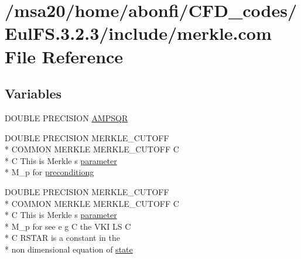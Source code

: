 \hypertarget{msa20_2home_2abonfi_2_c_f_d__codes_2_eul_f_s_83_82_83_2include_2merkle_8com}{\section{/msa20/home/abonfi/\-C\-F\-D\-\_\-codes/\-Eul\-F\-S.3.2.3/include/merkle.com File Reference}
\label{msa20_2home_2abonfi_2_c_f_d__codes_2_eul_f_s_83_82_83_2include_2merkle_8com}
}
\subsection*{Variables}
\begin{DoxyCompactItemize}
\item 
D\-O\-U\-B\-L\-E P\-R\-E\-C\-I\-S\-I\-O\-N \hyperlink{msa20_2home_2abonfi_2_c_f_d__codes_2_eul_f_s_83_82_83_2include_2merkle_8com_a090e7861d41fe8b944374d3c9f7365bd}{A\-M\-P\-S\-Q\-R}
\item 
D\-O\-U\-B\-L\-E P\-R\-E\-C\-I\-S\-I\-O\-N M\-E\-R\-K\-L\-E\-\_\-\-C\-U\-T\-O\-F\-F \\*
C\-O\-M\-M\-O\-N M\-E\-R\-K\-L\-E M\-E\-R\-K\-L\-E\-\_\-\-C\-U\-T\-O\-F\-F C \\*
C This is Merkle s \hyperlink{msa20_2home_2abonfi_2_c_f_d__codes_2_eul_f_s_83_82_83_2include_2time_8com_ac7fc4dfa4b612e199fef035c5cf70be1}{parameter} \\*
M\-\_\-p for \hyperlink{msa20_2home_2abonfi_2_c_f_d__codes_2_eul_f_s_83_82_83_2include_2merkle_8com_a0598863afc1fabc08a4d63618ed6d7d1}{preconditiong}
\item 
D\-O\-U\-B\-L\-E P\-R\-E\-C\-I\-S\-I\-O\-N M\-E\-R\-K\-L\-E\-\_\-\-C\-U\-T\-O\-F\-F \\*
C\-O\-M\-M\-O\-N M\-E\-R\-K\-L\-E M\-E\-R\-K\-L\-E\-\_\-\-C\-U\-T\-O\-F\-F C \\*
C This is Merkle s \hyperlink{msa20_2home_2abonfi_2_c_f_d__codes_2_eul_f_s_83_82_83_2include_2time_8com_ac7fc4dfa4b612e199fef035c5cf70be1}{parameter} \\*
M\-\_\-p for see e g C the V\-K\-I L\-S C \\*
C R\-S\-T\-A\-R is a constant in the \\*
non dimensional equation of \hyperlink{msa20_2home_2abonfi_2_c_f_d__codes_2_eul_f_s_83_82_83_2include_2merkle_8com_a0ca46ab387e5b2d25720de7e533a6180}{state}
\end{DoxyCompactItemize}


